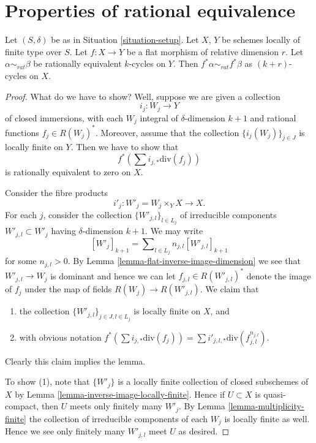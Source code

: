 \section{Properties of rational equivalence}
\label{section-properties-rational-equivalence}

\begin{lemma}
\label{lemma-flat-pullback-rational-equivalence}
Let $(S, \delta)$ be as in Situation \ref{situation-setup}.
Let $X$, $Y$ be schemes locally of finite type over $S$.
Let $f : X \to Y$ be a flat morphism of relative dimension $r$.
Let $\alpha \sim_{rat} \beta$ be rationally equivalent $k$-cycles on $Y$.
Then $f^*\alpha \sim_{rat} f^*\beta$ as $(k + r)$-cycles on $X$.
\end{lemma}

\begin{proof}
What do we have to show? Well, suppose we are given a collection
$$
i_j : W_j \longrightarrow Y
$$
of closed immersions, with each $W_j$ integral of $\delta$-dimension $k + 1$
and rational functions $f_j \in R(W_j)^*$.
Moreover, assume that
the collection $\{i_j(W_j)\}_{j \in J}$ is locally finite on $Y$.
Then we have to show that
$$
f^*(\sum i_{j, *}\text{div}(f_j))
$$
is rationally equivalent to zero on $X$.

\medskip\noindent
Consider the fibre products
$$
i'_j :
W'_j = W_j \times_Y X
\longrightarrow
X.
$$
For each $j$, consider the collection $\{W'_{j, l}\}_{l \in L_j}$
of irreducible components $W'_{j, l} \subset W'_j$ having $\delta$-dimension
$k + 1$. We may write
$$
[W'_j]_{k + 1} = \sum\nolimits_{l \in L_j} n_{j, l}[W'_{j, l}]_{k + 1}
$$
for some $n_{j, l} > 0$.
By Lemma \ref{lemma-flat-inverse-image-dimension}
we see that $W'_{j, l} \to W_j$ is
dominant and hence we can let $f_{j, l} \in R(W'_{j, l})^*$ denote the
image of $f_j$ under the map of fields $R(W_j) \to R(W'_{j, l})$.
We claim that
\begin{enumerate}
\item the collection $\{W'_{j, l}\}_{j \in J, l \in L_j}$ is
locally finite on $X$, and
\item with obvious notation
$f^*(\sum i_{j, *}\text{div}(f_j))
=
\sum i'_{j, l, *} \text{div}(f_{j, l}^{n_{j, l}})$.
\end{enumerate}
Clearly this claim implies the lemma.

\medskip\noindent
To show (1), note that $\{W'_j\}$ is a locally finite collection
of closed subschemes of $X$ by Lemma \ref{lemma-inverse-image-locally-finite}.
Hence if $U \subset X$ is quasi-compact, then $U$ meets only finitely
many $W'_j$. By Lemma \ref{lemma-multiplicity-finite} the collection of
irreducible components of each $W_j$ is locally finite as well. Hence
we see only finitely many $W'_{j, l}$ meet $U$ as desired.


\end{proof}
